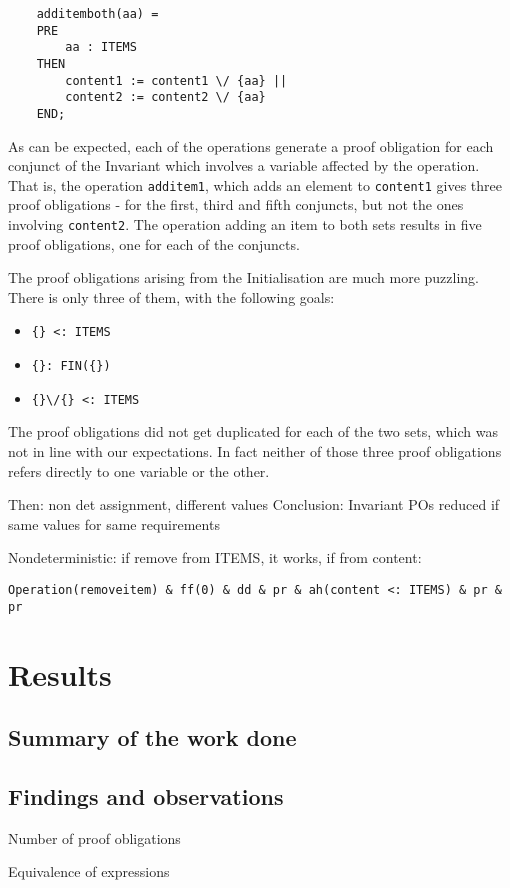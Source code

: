 \documentclass[11pt,journal]{IEEEtran}
\begin{document}
	\begin{lstlisting}
	additemboth(aa) =
	PRE
		aa : ITEMS
	THEN
		content1 := content1 \/ {aa} ||
		content2 := content2 \/ {aa}
	END;
	\end{lstlisting}
	
	As can be expected, each of the operations generate a proof obligation for each conjunct of the Invariant which involves a variable affected by the operation. That is, the operation \texttt{additem1}, which adds an element to \texttt{content1} gives three proof obligations - for the first, third and fifth conjuncts, but not the ones involving \texttt{content2}. The operation adding an item to both sets results in five proof obligations, one for each of the conjuncts.
	
	The proof obligations arising from the Initialisation are much more puzzling. There is only three of them, with the following goals:
	\begin{itemize}
		\item \verb|{} <: ITEMS |
		\item \verb|{}: FIN({}) |
		\item \verb|{}\/{} <: ITEMS|
	\end{itemize}
	The proof obligations did not get duplicated for each of the two sets, which was not in line with our expectations. In fact neither of those three proof obligations refers directly to one variable or the other.
	
	
	Then: non det assignment, different values
	Conclusion: Invariant POs reduced if same values for same requirements
	
	
	Nondeterministic:
	if remove from ITEMS, it works, if from content:
	
\verb|Operation(removeitem) & ff(0) & dd & pr & ah(content <: ITEMS) & pr & pr|
	

	\section{Results}
	\subsection{Summary of the work done}
	
	
	\subsection{Findings and observations}
	Number of proof obligations
	
	Equivalence of expressions
	
\end{document}
